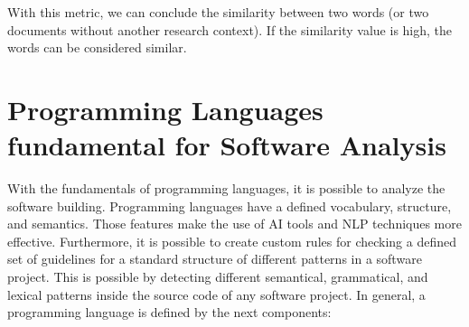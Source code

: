 With this metric, we can conclude the similarity between two words (or two documents without another research context). If the similarity value is high, the words can be considered similar.

\section{Programming Languages fundamental for Software Analysis}
With the fundamentals of programming languages, it is possible to analyze the software building. Programming languages have a defined vocabulary, structure, and semantics. Those features make the use of AI tools and NLP techniques more effective. Furthermore, it is possible to create custom rules for checking a defined set of guidelines for a standard structure of different patterns in a software project. This is possible by detecting different semantical, grammatical, and lexical patterns inside the source code of any software project. In general, a programming language is defined by the next components:

